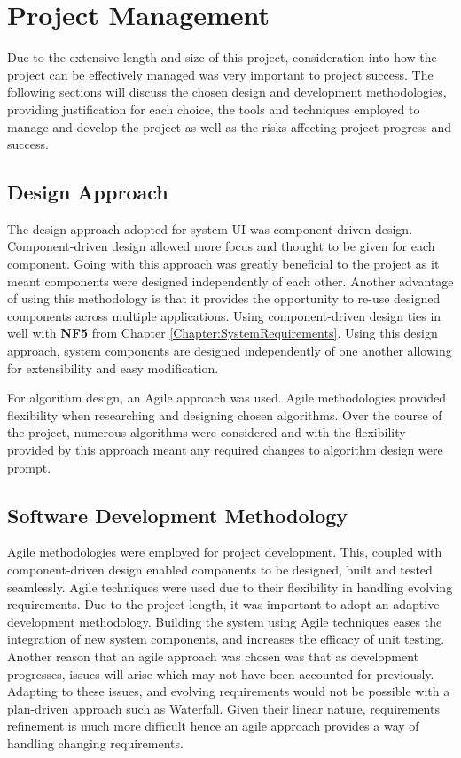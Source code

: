 \chapter{Project Management}
\label{Chapter:ProjectManagement}
Due to the extensive length and size of this project, consideration into how the project can be effectively
managed was very important to project success. The following sections will discuss the chosen design and development methodologies, providing justification for each choice, the tools and techniques employed to manage and develop the project as well as the risks affecting project progress and success.

\section{Design Approach}
The design approach adopted for system UI was component-driven design. Component-driven design allowed more focus and thought to be given for each component. Going with this approach was greatly beneficial to the project as it meant components were designed independently of each other. Another advantage of using this methodology is that it provides the opportunity to re-use designed components across multiple applications. Using component-driven design ties in well with \textbf{NF5} from Chapter \ref{Chapter:SystemRequirements}. Using this design approach, system components are designed independently of one another allowing for extensibility and easy modification.

For algorithm design, an Agile approach was used. Agile methodologies provided flexibility when researching and designing chosen algorithms. Over the course of the project, numerous algorithms were considered and with the flexibility provided by this approach meant any required changes to algorithm design were prompt.

\section{Software Development Methodology}
Agile methodologies were employed for project development. This, coupled with component-driven design enabled components to be designed, built and tested seamlessly. Agile techniques were used due to their flexibility in handling evolving requirements. Due to the project length, it was important to adopt an adaptive development methodology. Building the system using Agile techniques eases the integration of new system components, and increases the efficacy of unit testing. Another reason that an agile approach was chosen was that as development progresses, issues will arise which may not have been accounted for previously. Adapting to these issues, and evolving requirements would not be possible with a plan-driven approach such as Waterfall. Given their linear nature, requirements refinement is much more difficult hence an agile approach provides a way of handling changing requirements. 


